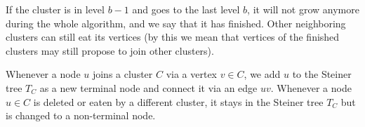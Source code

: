 If the cluster is in level $b-1$ and goes to the last level $b$, it will not grow anymore during the whole algorithm, and  we  say  that  it  has finished.    Other  neighboring clusters can still eat its vertices (by this we mean that vertices of the finished clusters may still propose to join other clusters). 

Whenever  a  node $u$ joins  a  cluster $C$ via  a  vertex $v\in C$, we add $u$ to the Steiner tree $T_C$ as a new terminal node and connect it via an edge $uv$.  Whenever a node $u\in C$ is deleted or eaten by a different cluster, it stays in the Steiner tree $T_C$ but is changed to a non-terminal node.



